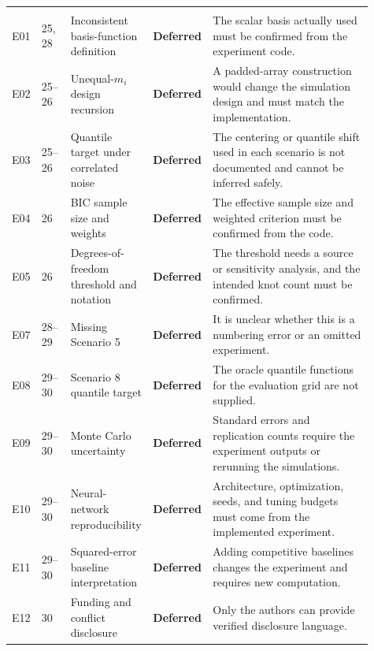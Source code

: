 \documentclass[10pt]{article}
\newcommand{\deferred}{\textcolor{deferredred}{\textbf{Deferred}}}
\begin{document}
\begin{landscape}
\begin{longtable}{L{0.045\linewidth}L{0.08\linewidth}L{0.21\linewidth}L{0.13\linewidth}L{0.445\linewidth}}
\addlinespace
{}\\
\addlinespace
{}E01 & 25, 28 & Inconsistent basis-function definition & \deferred &
The scalar basis actually used must be confirmed from the experiment code.\\
E02 & 25--26 & Unequal-$m_i$ design recursion & \deferred & A padded-array construction
would change the simulation design and must match the implementation.\\
E03 & 25--26 & Quantile target under correlated noise & \deferred &
The centering or quantile shift used in each scenario is not documented and
cannot be inferred safely.\\
E04 & 26 & BIC sample size and weights & \deferred & The effective sample size and
weighted criterion must be confirmed from the code.\\
E05 & 26 & Degrees-of-freedom threshold and notation & \deferred &
The threshold needs a source or sensitivity analysis, and the intended knot
count must be confirmed.\\
E07 & 28--29 & Missing Scenario 5 & \deferred & It is unclear whether this is a numbering
error or an omitted experiment.\\
E08 & 29--30 & Scenario 8 quantile target & \deferred & The oracle
quantile functions for the evaluation grid are not supplied.\\
E09 & 29--30 & Monte Carlo uncertainty & \deferred & Standard errors and replication
counts require the experiment outputs or rerunning the simulations.\\
E10 & 29--30 & Neural-network reproducibility & \deferred &
Architecture, optimization, seeds, and tuning budgets must come from the
implemented experiment.\\
E11 & 29--30 & Squared-error baseline interpretation & \deferred & Adding competitive
baselines changes the experiment and requires new computation.\\
E12 & 30 & Funding and conflict disclosure & \deferred & Only the
authors can provide verified disclosure language.\\
\end{longtable}
\end{landscape}
\end{document}
